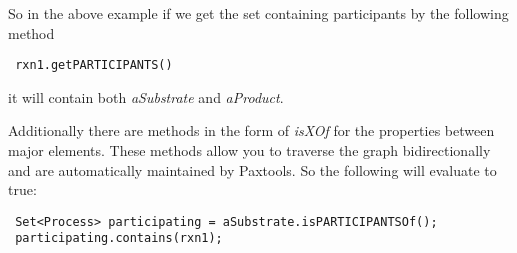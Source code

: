 \documentclass[10pt]{article}
\newenvironment{mylisting}
{\begin{list}{}{\setlength{\leftmargin}{2em}}\item\small\bfseries}
{\end{list}}
\begin{document}
So in the above example if we get the set containing participants by the following method

\begin{mylisting}
\begin{verbatim}
 rxn1.getPARTICIPANTS()
\end{verbatim}
\end{mylisting}

it will contain both \textit{aSubstrate} and \textit{aProduct}.

Additionally there are methods in the form of \textit{isXOf} for the properties between major elements. These methods allow you to traverse the graph bidirectionally and are automatically maintained by Paxtools. So the following will evaluate to true:

\begin{mylisting}
\begin{verbatim}
 Set<Process> participating = aSubstrate.isPARTICIPANTSOf();
 participating.contains(rxn1);
\end{verbatim}
\end{mylisting}
\end{document}
